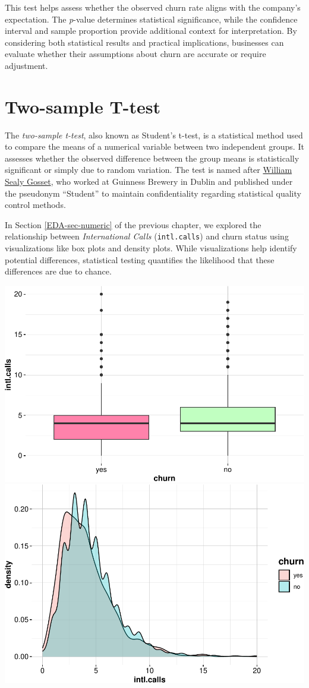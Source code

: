 \documentclass[
]{book}
\newcommand{\passthrough}[1]{#1}
\theoremstyle{definition}
\theoremstyle{definition}
\theoremstyle{definition}
\theoremstyle{definition}
\theoremstyle{remark}
\begin{document}
This test helps assess whether the observed churn rate aligns with the company's expectation. The \emph{p}-value determines statistical significance, while the confidence interval and sample proportion provide additional context for interpretation. By considering both statistical results and practical implications, businesses can evaluate whether their assumptions about churn are accurate or require adjustment.

\section{Two-sample T-test}\label{two-sample-t-test}

The \emph{two-sample t-test}, also known as Student's t-test, is a statistical method used to compare the means of a numerical variable between two independent groups. It assesses whether the observed difference between the group means is statistically significant or simply due to random variation. The test is named after \href{https://en.wikipedia.org/wiki/William_Sealy_Gosset}{William Sealy Gosset}, who worked at Guinness Brewery in Dublin and published under the pseudonym ``Student'' to maintain confidentiality regarding statistical quality control methods.

In Section \ref{EDA-sec-numeric} of the previous chapter, we explored the relationship between \emph{International Calls} (\passthrough{\lstinline!intl.calls!}) and churn status using visualizations like box plots and density plots. While visualizations help identify potential differences, statistical testing quantifies the likelihood that these differences are due to chance.

\includegraphics[width=0.5\linewidth]{statistics_files/figure-latex/unnamed-chunk-8-1} \includegraphics[width=0.5\linewidth]{statistics_files/figure-latex/unnamed-chunk-8-2}
\end{document}
